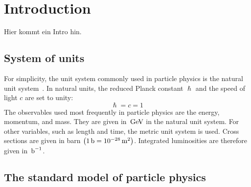 \chapter{Introduction}\label{chap:introduction}
\minitoc
Hier kommt ein Intro hin.





\section{System of units}\label{sec:units}

For simplicity, the unit system commonly used in particle physics is the natural unit system~\cite{UnitSystem}. In natural units, the reduced Planck constant $\hslash$ and the speed of light $c$ are set to unity:
\begin{equation}
 \hslash=c=1
\end{equation}
The observables used most frequently in particle physics are the energy, momentum, and mass. They are given in $\,\text{Ge\hspace{-.08em}V}$ in the natural unit system. For other variables, such as length and time, the metric unit system is used. Cross sections are given in barn $\left(1\,\text{b}=10^{-28}\,\text{m}^2\right)$. Integrated luminosities are therefore given in $\mbox{\ensuremath{\,\text{b}^\text{$-$1}}}$.

\section{The standard model of particle physics}\label{sec:SM}

